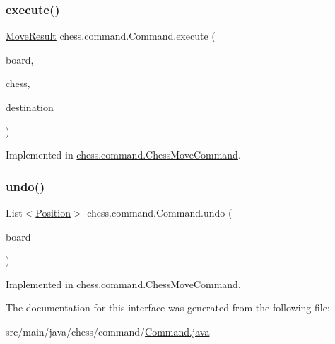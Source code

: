 \subsubsection{\texorpdfstring{execute()}{execute()}}
{\footnotesize\ttfamily \mbox{\hyperlink{enumchess_1_1models_1_1enums_1_1_move_result}{Move\+Result}} chess.\+command.\+Command.\+execute (\begin{DoxyParamCaption}\item[{\mbox{\hyperlink{classchess_1_1models_1_1_board}{Board}}}]{board,  }\item[{\mbox{\hyperlink{classchess_1_1models_1_1_chess_piece}{Chess\+Piece}}}]{chess,  }\item[{\mbox{\hyperlink{classchess_1_1models_1_1_position}{Position}}}]{destination }\end{DoxyParamCaption})}



Implemented in \mbox{\hyperlink{classchess_1_1command_1_1_chess_move_command_a7a74fa700b53038f06de08a11699d37e}{chess.\+command.\+Chess\+Move\+Command}}.

\mbox{\label{interfacechess_1_1command_1_1_command_a7e407e4a40124384e8262aa573fbeaac}} 
\subsubsection{\texorpdfstring{undo()}{undo()}}
{\footnotesize\ttfamily List$<$\mbox{\hyperlink{classchess_1_1models_1_1_position}{Position}}$>$ chess.\+command.\+Command.\+undo (\begin{DoxyParamCaption}\item[{\mbox{\hyperlink{classchess_1_1models_1_1_board}{Board}}}]{board }\end{DoxyParamCaption})}



Implemented in \mbox{\hyperlink{classchess_1_1command_1_1_chess_move_command_a31a0cc0d4b19d5441f9420e0d4c1a795}{chess.\+command.\+Chess\+Move\+Command}}.



The documentation for this interface was generated from the following file\+:\begin{DoxyCompactItemize}
\item 
src/main/java/chess/command/\mbox{\hyperlink{_command_8java}{Command.\+java}}\end{DoxyCompactItemize}
